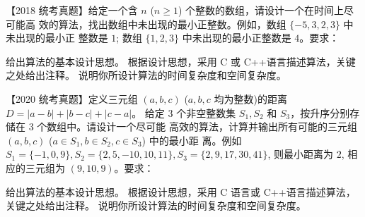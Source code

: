 \begin{qitems}
    \begin{bbox}
        \qitem 【2018 统考真题】给定一个含 $n$ ($n\geqslant 1$) 个整数的数组，请设计一个在时间上尽可能高
        效的算法，找出数组中未出现的最小正整数。例如，数组 $\{-5,3,2,3\}$ 中未出现的最小正
        整数是 $1$; 数组 $\{1,2,3\}$ 中未出现的最小正整数是 $4$。要求：
        \begin{subqitems}
            \subqitem 给出算法的基本设计思想。
            \subqitem 根据设计思想，采用 C 或 C++语言描述算法，关键之处给出注释。
            \subqitem 说明你所设计算法的时间复杂度和空间复杂度。
        \end{subqitems}
    \end{bbox}

    \begin{bbox}
        \qitem 【2020 统考真题】定义三元组 $(a,b,c)$ ($a,b,c$ 均为整数)的距离 $D=|a-b|+|b-c|+|c-a|$。
        给定 $3$ 个非空整数集 $S_1, S_2$ 和 $S_3$，按升序分别存储在 $3$ 个数组中。请设计一个尽可能
        高效的算法，计算并输出所有可能的三元组 $(a,b,c)$ ($a\in S_1, b\in S_2, c\in S_3$) 中的最小距
        离。例如 $S_1=\{-1,0,9\}, S_2=\{2,5,-10,10,11\}, S_3=\{2,9,17,30,41\}$, 则最小距离为 $2$,
        相应的三元组为 $(9,10,9)$。要求：
        \begin{subqitems}
            \subqitem 给出算法的基本设计思想。
            \subqitem 根据设计思想，采用 C 语言或 C++语言描述算法，关键之处给出注释。
            \subqitem 说明你所设计算法的时间复杂度和空间复杂度。
        \end{subqitems}
    \end{bbox}

\end{qitems}
